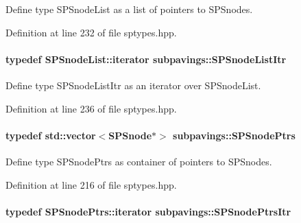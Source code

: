 \-Define type \-S\-P\-Snode\-List as a list of pointers to \-S\-P\-Snodes. 



\-Definition at line 232 of file sptypes.\-hpp.

\hypertarget{namespacesubpavings_a984883a654b8d040041f722f8ead7dc2}{
\paragraph[{\-S\-P\-Snode\-List\-Itr}]{\setlength{\rightskip}{0pt plus 5cm}typedef \-S\-P\-Snode\-List\-::iterator {\bf subpavings\-::\-S\-P\-Snode\-List\-Itr}}}\label{namespacesubpavings_a984883a654b8d040041f722f8ead7dc2}


\-Define type \-S\-P\-Snode\-List\-Itr as an iterator over \-S\-P\-Snode\-List. 



\-Definition at line 236 of file sptypes.\-hpp.

\hypertarget{namespacesubpavings_ad23942a388da964ca7487e496d0f2923}{
\paragraph[{\-S\-P\-Snode\-Ptrs}]{\setlength{\rightskip}{0pt plus 5cm}typedef std\-::vector$<${\bf \-S\-P\-Snode}$\ast$$>$ {\bf subpavings\-::\-S\-P\-Snode\-Ptrs}}}\label{namespacesubpavings_ad23942a388da964ca7487e496d0f2923}


\-Define type \-S\-P\-Snode\-Ptrs as container of pointers to \-S\-P\-Snodes. 



\-Definition at line 216 of file sptypes.\-hpp.

\hypertarget{namespacesubpavings_a3d06253195e32236cc10b1c2050073c9}{
\paragraph[{\-S\-P\-Snode\-Ptrs\-Itr}]{\setlength{\rightskip}{0pt plus 5cm}typedef \-S\-P\-Snode\-Ptrs\-::iterator {\bf subpavings\-::\-S\-P\-Snode\-Ptrs\-Itr}}}\label{namespacesubpavings_a3d06253195e32236cc10b1c2050073c9}


